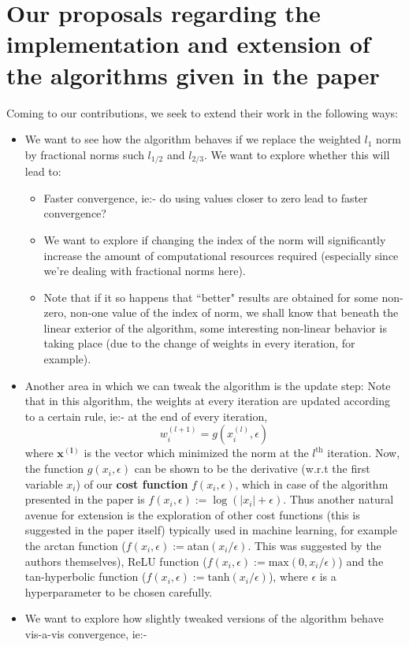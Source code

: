 \documentclass[a4paper,11pt]{article}
\numberwithin{definition}{section}
\numberwithin{mytheorem}{subsection}
\begin{document}
\section{Our proposals regarding the implementation and extension of the algorithms given in the paper}
Coming to our contributions, we seek to extend their work in the following ways:
\begin{itemize}
\item We want to see how the algorithm behaves if we replace the weighted $l_1$ norm by fractional norms such $l_{1/2}$ and $l_{2/3}$. We want to explore whether this will lead to:
\begin{itemize}
\item Faster convergence, ie:- do using values closer to zero lead to faster convergence?
\item We want to explore if changing the index of the norm will significantly increase the amount of computational resources required (especially since we're dealing with fractional norms here).
\item Note that if it so happens that ``better" results are obtained for some non-zero, non-one value of the index of norm, we shall know that beneath the linear exterior of the algorithm, some interesting non-linear behavior is taking place (due to the change of weights in every iteration, for example).
\end{itemize}
\item Another area in which we can tweak the algorithm is the update step: Note that in this algorithm, the weights at every iteration are updated according to a certain rule, ie:- at the end of every iteration, 
$$w^{(l+1)}_i = g(x_i^{(l)}, \epsilon)$$
where $\boldsymbol{x^{(l)}}$ is the vector which minimized the norm at the $l^{\mathrm{th}}$ iteration. Now, the function $g(x_i, \epsilon)$ can be shown to be the derivative (w.r.t the first variable $x_i$) of our \textbf{cost function} $f(x_i, \epsilon)$, which in case of the algorithm presented in the paper is $f(x_i, \epsilon) := \log (|x_i| + \epsilon)$. Thus another natural avenue for extension is the exploration of other cost functions (this is suggested in the paper itself) typically used in machine learning, for example the arctan function ($f(x_i, \epsilon) :=$atan$(x_i/\epsilon)$. This was suggested by the authors themselves), ReLU function ($f(x_i, \epsilon) := \mathrm{max}(0, x_i/\epsilon)$) and the tan-hyperbolic function ($f(x_i, \epsilon) := \mathrm{tanh}(x_i/\epsilon)$), where $\epsilon$ is a hyperparameter to be chosen carefully.
\item We want to explore how slightly tweaked versions of the algorithm behave vis-a-vis convergence, ie:-

\end{itemize}
\end{document}
